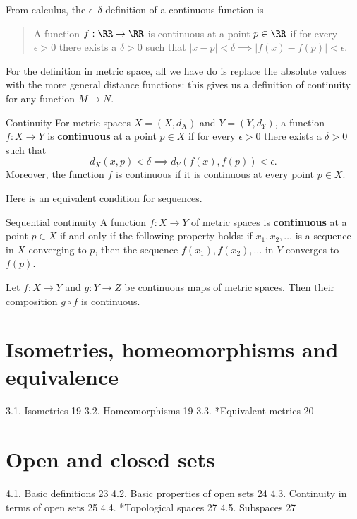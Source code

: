 From calculus, the $\epsilon$--$\delta$ definition of a continuous function is
\begin{quote}
A function $f: \RR \to \RR$ is continuous at a point $p \in \RR$ if for every $\epsilon > 0$ there exists a $\delta > 0$ such that $|x-p| < \delta \implies |f(x)-f(p)| < \epsilon$.
\end{quote}

For the definition in metric space, all we have do is replace the absolute values with the more general distance functions: this gives us a definition of continuity for any function $M \to N$.

\begin{defn}{Continuity}{}
For metric spaces $X = (X, d_X)$ and $Y = (Y, d_Y)$, a function $f:X \to Y$ is \textbf{continuous} at a point $p \in X$ if for every $\epsilon > 0$ there exists a $\delta > 0$ such that
\[ d_X(x,p) < \delta \implies d_Y(f(x), f(p)) < \epsilon. \]
Moreover, the function $f$ is continuous if it is continuous at every point $p \in X$.
\end{defn}

Here is an equivalent condition for sequences.

\begin{thrm}{Sequential continuity}{}
A function $f:X \to Y$ of metric spaces is \textbf{continuous} at a point $p \in X$ if and only if the following property holds: if $x_1, x_2, \dots$ is a sequence in $X$ converging to $p$, then the sequence $f(x_1), f(x_2), \dots$ in $Y$ converges to $f(p)$.
\end{thrm}

\begin{proposition}
Let $f: X \to Y$ and $g: Y \to Z$ be continuous maps of metric spaces. Then their composition $g \circ f$ is continuous.
\end{proposition}
\pagebreak

\section{Isometries, homeomorphisms and equivalence}
3.1. Isometries 19
3.2. Homeomorphisms 19
3.3. *Equivalent metrics 20

\section{Open and closed sets}
4.1. Basic definitions 23
4.2. Basic properties of open sets 24
4.3. Continuity in terms of open sets 25
4.4. *Topological spaces 27
4.5. Subspaces 27

